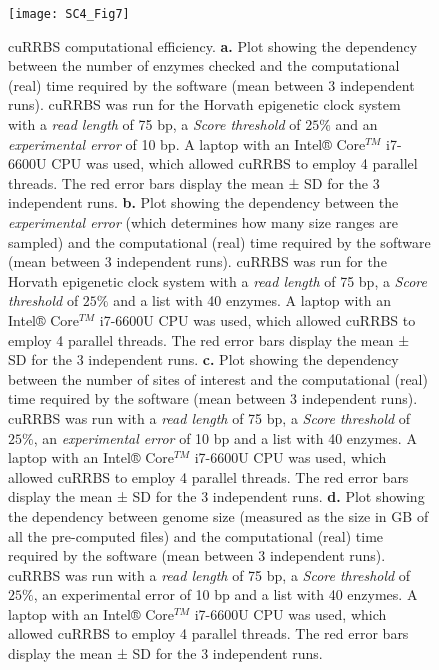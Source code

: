 \begin{figure}[htbp!] 
	\centering    
	\texttt{[image: SC4\_Fig7]}
	\vspace*{1mm}
	\caption[cuRRBS computational efficiency]{cuRRBS computational efficiency. \textbf{a.} Plot showing the dependency between the number of enzymes checked and the computational (real) time required by the software (mean between 3 independent runs). cuRRBS was run for the Horvath epigenetic clock system \citep{Horvath2013} with a \textit{read length} of 75 bp, a \textit{Score threshold} of $25\%$ and an \textit{experimental error} of 10 bp. A laptop with an Intel® Core$^{TM}$ i7-6600U CPU was used, which allowed cuRRBS to employ 4 parallel threads. The red error bars display the mean ± \acrshort{SD} for the 3 independent runs. \textbf{b.} Plot showing the dependency between the \textit{experimental error} (which determines how many size ranges are sampled) and the computational (real) time required by the software (mean between 3 independent runs). cuRRBS was run for the Horvath epigenetic clock system \citep{Horvath2013} with a \textit{read length} of 75 bp, a \textit{Score threshold} of $25\%$ and a list with 40 enzymes. A laptop with an Intel® Core$^{TM}$ i7-6600U CPU was used, which allowed cuRRBS to employ 4 parallel threads. The red error bars display the mean ± SD for the 3 independent runs. \textbf{c.} Plot showing the dependency between the number of sites of interest and the computational (real) time required by the software (mean between 3 independent runs). cuRRBS was run with a \textit{read length} of 75 bp, a \textit{Score threshold} of $25\%$, an \textit{experimental error} of 10 bp and a list with 40 enzymes. A laptop with an Intel® Core$^{TM}$ i7-6600U CPU was used, which allowed cuRRBS to employ 4 parallel threads. The red error bars display the mean ± SD for the 3 independent runs. \textbf{d.} Plot showing the dependency between genome size (measured as the size in GB of all the pre-computed files) and the computational (real) time required by the software (mean between 3 independent runs). cuRRBS was run with a \textit{read length} of 75 bp, a \textit{Score threshold} of $25\%$, an experimental error of 10 bp and a list with 40 enzymes. A laptop with an Intel® Core$^{TM}$ i7-6600U CPU was used, which allowed cuRRBS to employ 4 parallel threads. The red error bars display the mean ± SD for the 3 independent runs.}
	\label{fig:sc4_fig7}
\end{figure}


